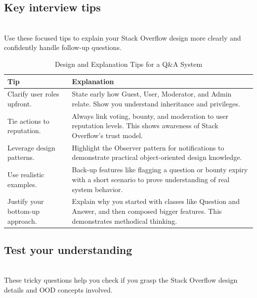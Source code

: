 \subsection{Key interview tips}\label{JiCHNi_Pr2OzlJeHYJZsu}
\\
Use these focused tips to explain your Stack Overflow design more clearly and confidently handle follow-up questions.

\begin{table}[h!]
\centering
\begin{tabular}{|p{6cm}|p{9cm}|}
\hline
\textbf{Tip} & \textbf{Explanation} \\
\hline
Clarify user roles upfront. & 
State early how Guest, User, Moderator, and Admin relate. Show you understand inheritance and privileges. \\
\hline
Tie actions to reputation. & 
Always link voting, bounty, and moderation to user reputation levels. This shows awareness of Stack Overflow’s trust model. \\
\hline
Leverage design patterns. & 
Highlight the Observer pattern for notifications to demonstrate practical object-oriented design knowledge. \\
\hline
Use realistic examples. & 
Back-up features like flagging a question or bounty expiry with a short scenario to prove understanding of real system behavior. \\
\hline
Justify your bottom-up approach. & 
Explain why you started with classes like Question and Answer, and then composed bigger features. This demonstrates methodical thinking. \\
\hline
\end{tabular}
\caption{Design and Explanation Tips for a Q\&A System}
\label{tab:qa_design_tips}
\end{table}


\subsection{Test your understanding}\label{onBu7Gkxf3hnv0XzJdd_z}
\\
These tricky questions help you check if you grasp the Stack Overflow design details and OOD concepts involved.


